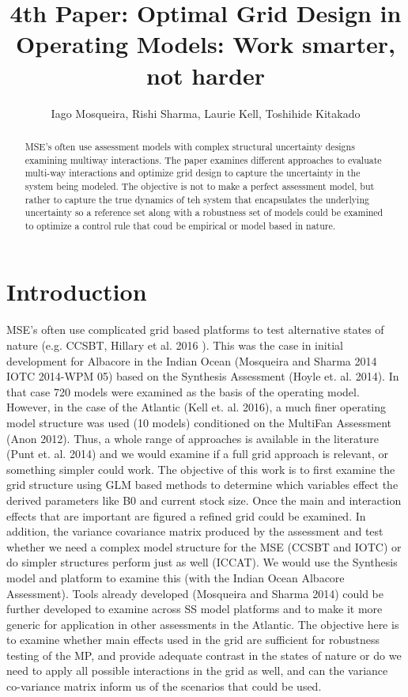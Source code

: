 \documentclass[a4paper]{article}
\title{4th Paper: Optimal Grid Design in Operating Models: Work smarter, not harder}
\author{Iago Mosqueira, Rishi Sharma, Laurie Kell, Toshihide  Kitakado}
\begin{document}
\maketitle

\begin{abstract}
MSE's often use assessment models with complex structural uncertainty designs examining multiway interactions. The paper examines different approaches to evaluate multi-way interactions and optimize grid design to capture the uncertainty in the system being modeled. The objective is not to make a perfect assessment model, but rather to capture the true dynamics of teh system that encapsulates the underlying uncertainty so a reference set along with a robustness set of models could be examined to optimize a control rule that coud be empirical or model based in nature.

\end{abstract}

\section{Introduction}

MSE’s often use complicated grid based platforms to test alternative states of nature (e.g. CCSBT, Hillary et al. 2016 ). This was the case in initial development for Albacore in the Indian Ocean (Mosqueira and Sharma 2014 IOTC 2014-WPM 05) based on the Synthesis Assessment (Hoyle et. al. 2014). In that case 720 models were examined as the basis of the operating model. However, in the case of the Atlantic (Kell et. al. 2016), a much finer operating model structure was used (10 models) conditioned on the MultiFan Assessment (Anon 2012).  Thus, a whole range of approaches is available in the literature (Punt et. al. 2014) and we would examine if a full grid approach is relevant, or something simpler could work. 
The objective of this work is to first examine the grid structure using GLM based methods to determine which variables effect the derived parameters like B0 and current stock size. Once the main and interaction effects that are important are figured a refined grid could be examined.
In addition, the variance covariance matrix produced by the assessment and test whether we need a complex model structure for the MSE (CCSBT and IOTC) or do simpler structures perform just as well (ICCAT). We would use the Synthesis model and platform to examine this (with the Indian Ocean Albacore Assessment). Tools already developed (Mosqueira and Sharma 2014) could be further developed to examine across SS model platforms and to make it more generic for application in other assessments in the Atlantic. 
The objective here is to examine whether main effects used in the grid are sufficient for robustness testing of the MP, and provide adequate contrast in the states of nature or do we need to apply all possible interactions in the grid as well, and can the variance co-variance matrix inform us of the scenarios that could be used.
\end{document}
